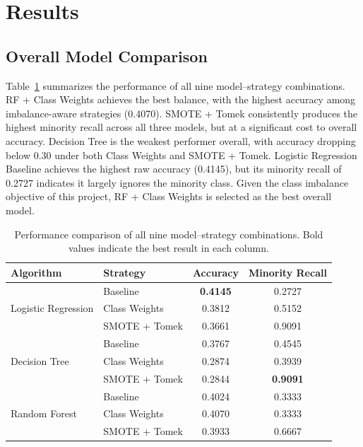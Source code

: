 \documentclass[12pt, a4paper]{article}
\begin{document}
\section{Results}

\subsection{Overall Model Comparison}

Table~\ref{tab:all-results} summarizes the performance of all nine model--strategy
combinations. RF + Class Weights achieves the best balance, with the highest accuracy
among imbalance-aware strategies (0.4070). SMOTE + Tomek consistently produces the
highest minority recall across all three models, but at a significant cost to overall
accuracy. Decision Tree is the weakest performer overall, with accuracy dropping below
0.30 under both Class Weights and SMOTE + Tomek. Logistic Regression Baseline achieves
the highest raw accuracy (0.4145), but its minority recall of 0.2727 indicates it largely
ignores the minority class. Given the class imbalance objective of this project, RF +
Class Weights is selected as the best overall model.

\begin{table}[H]
\centering
\caption{Performance comparison of all nine model--strategy combinations. Bold values
indicate the best result in each column.}
\label{tab:all-results}
\begin{tabular}{llcc}
\toprule
\textbf{Algorithm} & \textbf{Strategy} & \textbf{Accuracy} & \textbf{Minority Recall} \\
\midrule
\multirow{3}{*}{Logistic Regression}
    & Baseline        & \textbf{0.4145} & 0.2727 \\
    & Class Weights   & 0.3812          & 0.5152 \\
    & SMOTE + Tomek   & 0.3661          & 0.9091 \\
\midrule
\multirow{3}{*}{Decision Tree}
    & Baseline        & 0.3767          & 0.4545 \\
    & Class Weights   & 0.2874          & 0.3939 \\
    & SMOTE + Tomek   & 0.2844          & \textbf{0.9091} \\
\midrule
\multirow{3}{*}{Random Forest}
    & Baseline        & 0.4024          & 0.3333 \\
    & Class Weights   & 0.4070          & 0.3333 \\
    & SMOTE + Tomek   & 0.3933          & 0.6667 \\
\bottomrule
\end{tabular}
\end{table}
\end{document}
